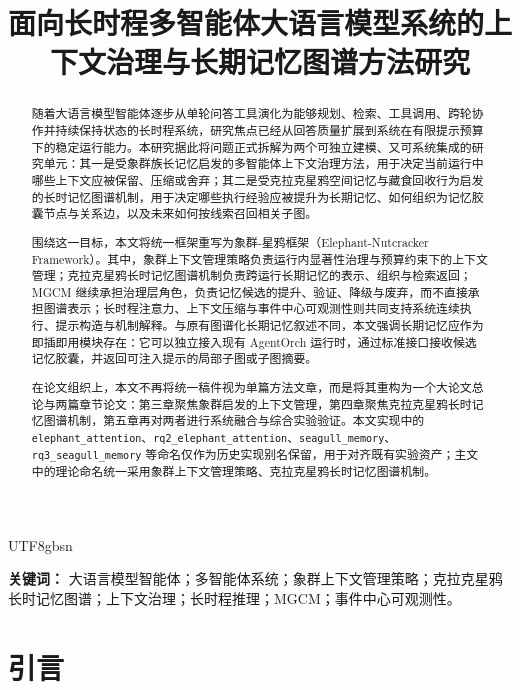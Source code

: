 \documentclass[a4paper,fleqn]{cas-sc}
\begin{document}
\begin{CJK*}{UTF8}{gbsn}
\let\WriteBookmarks\relax
\def\floatpagepagefraction{1}
\def\textpagefraction{.001}

\title{面向长时程多智能体大语言模型系统的上下文治理与长期记忆图谱方法研究}
\date{}

\maketitle

\begin{abstract}
随着大语言模型智能体逐步从单轮问答工具演化为能够规划、检索、工具调用、跨轮协作并持续保持状态的长时程系统，研究焦点已经从回答质量扩展到系统在有限提示预算下的稳定运行能力。本研究据此将问题正式拆解为两个可独立建模、又可系统集成的研究单元：其一是受象群族长记忆启发的多智能体上下文治理方法，用于决定当前运行中哪些上下文应被保留、压缩或舍弃；其二是受克拉克星鸦空间记忆与藏食回收行为启发的长时记忆图谱机制，用于决定哪些执行经验应被提升为长期记忆、如何组织为记忆胶囊节点与关系边，以及未来如何按线索召回相关子图。

围绕这一目标，本文将统一框架重写为象群-星鸦框架（Elephant-Nutcracker Framework）。其中，象群上下文管理策略负责运行内显著性治理与预算约束下的上下文管理；克拉克星鸦长时记忆图谱机制负责跨运行长期记忆的表示、组织与检索返回；MGCM 继续承担治理层角色，负责记忆候选的提升、验证、降级与废弃，而不直接承担图谱表示；长时程注意力、上下文压缩与事件中心可观测性则共同支持系统连续执行、提示构造与机制解释。与原有图谱化长期记忆叙述不同，本文强调长期记忆应作为即插即用模块存在：它可以独立接入现有 AgentOrch 运行时，通过标准接口接收候选记忆胶囊，并返回可注入提示的局部子图或子图摘要。

在论文组织上，本文不再将统一稿件视为单篇方法文章，而是将其重构为一个大论文总论与两篇章节论文：第三章聚焦象群启发的上下文管理，第四章聚焦克拉克星鸦长时记忆图谱机制，第五章再对两者进行系统融合与综合实验验证。本文实现中的 \texttt{elephant\_attention}、\texttt{rq2\_elephant\_attention}、\texttt{seagull\_memory}、\texttt{rq3\_seagull\_memory} 等命名仅作为历史实现别名保留，用于对齐既有实验资产；主文中的理论命名统一采用象群上下文管理策略、克拉克星鸦长时记忆图谱机制。
\end{abstract}

\noindent\textbf{关键词：} 大语言模型智能体；多智能体系统；象群上下文管理策略；克拉克星鸦长时记忆图谱；上下文治理；长时程推理；MGCM；事件中心可观测性。

\section{引言}


\end{CJK*}
\end{document}
